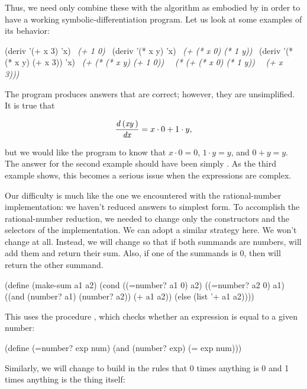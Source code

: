 \noindent
Thus, we need only combine these with the algorithm as embodied by 
in order to have a working symbolic-differentiation program.  Let us look at
some examples of its behavior:

\begin{codeBlock}
(deriv '(+ x 3) 'x)
~\textit{(+ 1 0)}~
(deriv '(* x y) 'x)
~\textit{(+ (* x 0) (* 1 y))}~
(deriv '(* (* x y) (+ x 3)) 'x)
~\textit{(+ (* (* x y) (+ 1 0))}~
   ~\textit{(* (+ (* x 0) (* 1 y))}~
      ~\textit{(+  x 3)))}~
\end{codeBlock}

\noindent
The program produces answers that are correct; however, they are unsimplified.
It is true that

$$ \frac{{\it d\,(xy\,)}}{{\it dx}} = x \cdot 0 + 1 \cdot y, $$

\noindent
but we would like the program to know that \( x \cdot 0 = 0 \), \( 1 \cdot y = y \),
and \( 0 + y = y \).  The answer for the second example should have been
simply .  As the third example shows, this becomes a serious issue when
the expressions are complex.

Our difficulty is much like the one we encountered with the rational-number
implementation: we haven't reduced answers to simplest form.  To accomplish the
rational-number reduction, we needed to change only the constructors and the
selectors of the implementation.  We can adopt a similar strategy here.  We
won't change  at all.  Instead, we will change  so
that if both summands are numbers,  will add them and return
their sum.  Also, if one of the summands is 0, then  will return
the other summand.

\begin{codeBlock}
(define (make-sum a1 a2)
  (cond ((=number? a1 0) a2)
        ((=number? a2 0) a1)
        ((and (number? a1) (number? a2))
         (+ a1 a2))
        (else (list '+ a1 a2))))
\end{codeBlock}

\noindent
This uses the procedure , which checks whether an expression is
equal to a given number:

\begin{codeBlock}
(define (=number? exp num) (and (number? exp) (= exp num)))
\end{codeBlock}

\noindent
Similarly, we will change  to build in the rules that 0
times anything is 0 and 1 times anything is the thing itself:

